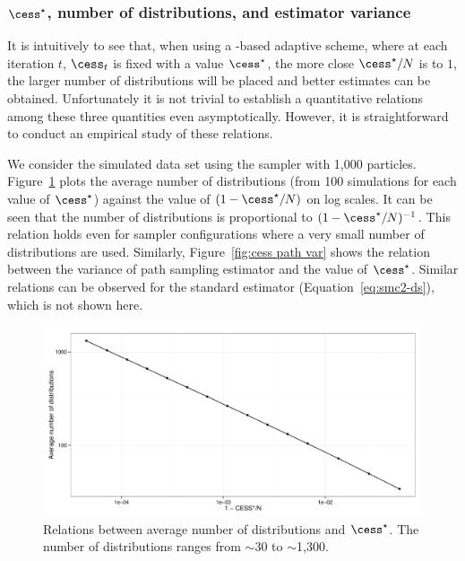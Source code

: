 \subsubsection[cess*, number of distributions, and estimator variance]
{$\cess^\star$, number of distributions, and estimator variance}
\label{ssub:cess*, number of distributions, and estimator variance}

It is intuitively to see that, when using a \cess-based adaptive scheme, where
at each iteration $t$, $\cess_t$ is fixed with a value $\cess^\star$, the more
close $\cess^\star/N$ is to $1$, the larger number of distributions will be placed
and better estimates can be obtained. Unfortunately it is not trivial to
establish a quantitative relations among these three quantities even
asymptotically. However, it is straightforward to conduct an empirical study
of these relations.

We consider the simulated \pet data set using the \smc[2] sampler with 1,000
particles. Figure~\ref{fig:cess iter mean} plots the average number of
distributions (from 100 simulations for each value of $\cess^\star$) against the
value of $(1 - \cess^\star/N)$ on log scales. It can be seen that the number of
distributions is proportional to $(1 - \cess^\star/N)^{-1}$. This relation
holds even for sampler configurations where a very small number of
distributions are used. Similarly, Figure~\ref{fig:cess path var} shows the
relation between the variance of path sampling estimator and the value of
$\cess^\star$. Similar relations can be observed for the standard estimator
(Equation~\eqref{eq:smc2-ds}), which is not shown here.

\begin{figure}[t]
  \includegraphics[width=\linewidth]{fig/CESS_Iter_Mean}
  \caption[Relations between average number of distributions and
  \protect\cess]
  {Relations between average number of distributions and
    $\cess^\star$. The number of distributions ranges from $\sim$30 to
    $\sim$1,300.}
  \label{fig:cess iter mean}
\end{figure}

